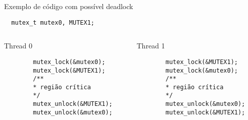 \begin{frame}[fragile]{Exemplo de código com possível deadlock}

\begin{lstlisting}
  mutex_t mutex0, MUTEX1;
\end{lstlisting}

\lstset{frame=single}
\begin{columns}
    \begin{column}{.5\textwidth}
      \begin{block}{Thread 0}
      \begin{lstlisting}
        mutex_lock(&mutex0);
        mutex_lock(&MUTEX1);
        /**
        * região crítica
        */
        mutex_unlock(&MUTEX1);
        mutex_unlock(&mutex0);
      \end{lstlisting}
    \end{block}
  \end{column}
  \begin{column}{.5\textwidth}
    \begin{block}{Thread 1}
      \begin{lstlisting}
        mutex_lock(&MUTEX1);
        mutex_lock(&mutex0);
        /**
        * região crítica
        */
        mutex_unlock(&mutex0);
        mutex_unlock(&MUTEX1);
      \end{lstlisting}
    \end{block}
  \end{column}
\end{columns}


\end{frame}

